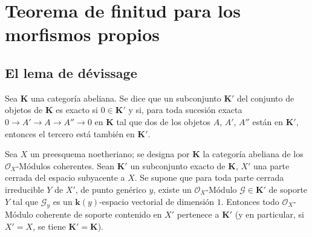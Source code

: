 \section{Teorema de finitud para los morfismos propios}
\label{section:III.3}
\label{section:III.3-fr}

\subsection{El lema de d\'evissage}
\label{subsection:III.3.1}
\label{subsection:III.3.1-fr}

\begin{definition}[3.1.1]
\label{III.3.1.1-fr}
Sea $\boldsymbol{K}$ una categoría abeliana. Se dice que un subconjunto $\boldsymbol{K}'$ del
conjunto de objetos de $\boldsymbol{K}$ es exacto si $0\in\boldsymbol{K}'$ y si, para toda
sucesión exacta
$0\to A'\to A\to A''\to0$
en $\boldsymbol{K}$ tal que dos de los objetos $A$, $A'$, $A''$ están en $\boldsymbol{K}'$, entonces el
tercero está también en $\boldsymbol{K}'$.
\end{definition}

\begin{theorem}[3.1.2]
\label{III.3.1.2-fr}
Sea $X$ un preesquema noetheriano; se designa por $\boldsymbol{K}$ la categoría abeliana
de los $\mathcal O_X$-Módulos coherentes. Sean $\boldsymbol{K}'$ un subconjunto exacto de
$\boldsymbol{K}$, $X'$ una parte cerrada del espacio subyacente a $X$. Se supone que
para toda parte cerrada irreducible $Y$ de $X'$, de punto genérico $y$,
existe un $\mathcal O_X$-Módulo $\mathcal G\in\boldsymbol{K}'$ de soporte $Y$ tal que $\mathcal G_y$ es
un $\boldsymbol{k}(y)$-espacio vectorial de dimensión $1$. Entonces todo $\mathcal O_X$-Módulo
coherente de soporte contenido en $X'$ pertenece a $\boldsymbol{K}'$ (y en particular,
si $X'=X$, se tiene $\boldsymbol{K}'=\boldsymbol{K}$).
\end{theorem}

